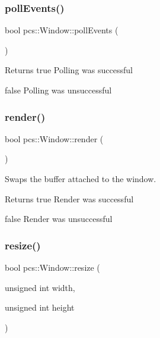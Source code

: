\subsubsection{\texorpdfstring{poll\+Events()}{pollEvents()}}
{\footnotesize\ttfamily bool pcs\+::\+Window\+::poll\+Events (\begin{DoxyParamCaption}{ }\end{DoxyParamCaption})}

\begin{DoxyReturn}{Returns}
true Polling was successful 

false Polling was unsuccessful 
\end{DoxyReturn}
\mbox{\label{classpcs_1_1Window_a13464abf63b4b42578628ac0e7f2a141}} 
\subsubsection{\texorpdfstring{render()}{render()}}
{\footnotesize\ttfamily bool pcs\+::\+Window\+::render (\begin{DoxyParamCaption}{ }\end{DoxyParamCaption})}



Swaps the buffer attached to the window. 

\begin{DoxyReturn}{Returns}
true Render was successful 

false Render was unsuccessful 
\end{DoxyReturn}
\mbox{\label{classpcs_1_1Window_a4918cb448c1b50b85b2cd5cbcb2d767e}} 
\subsubsection{\texorpdfstring{resize()}{resize()}}
{\footnotesize\ttfamily bool pcs\+::\+Window\+::resize (\begin{DoxyParamCaption}\item[{unsigned int}]{width,  }\item[{unsigned int}]{height }\end{DoxyParamCaption})}

\mbox{\label{classpcs_1_1Window_a4d103be3712fbb051d7c4d446a266de0}} 
